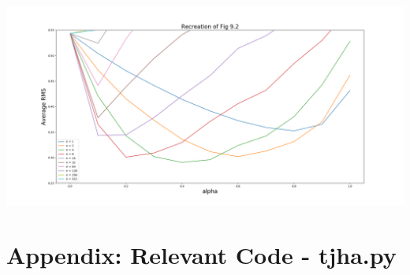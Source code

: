 \documentclass[11pt]{article}
\begin{document}
\includegraphics[scale=0.35]{FigureY.png}

\section*{Appendix: Relevant Code - tjha.py}
   
\end{document}
